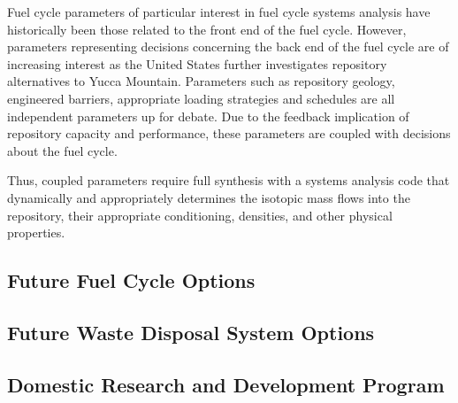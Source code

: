 
Fuel cycle parameters of particular interest in fuel cycle systems 
analysis have historically been those related to the front end of the fuel 
cycle.
However, parameters representing decisions concerning the back end
of the fuel cycle are of increasing interest as the United States further
investigates repository alternatives to Yucca Mountain.  Parameters such as
repository geology, engineered barriers, appropriate loading strategies and
schedules are all independent parameters up for debate. Due to the feedback 
implication of repository capacity and performance, these
parameters are coupled with decisions about the fuel cycle. 


Thus, coupled parameters require full synthesis with a systems analysis code 
that dynamically and appropriately determines the isotopic mass flows into the 
repository, their appropriate conditioning, densities, and other physical 
properties.  

\subsection{Future Fuel Cycle Options}

\subsection{Future Waste Disposal System Options}

\subsection{Domestic Research and Development Program}


